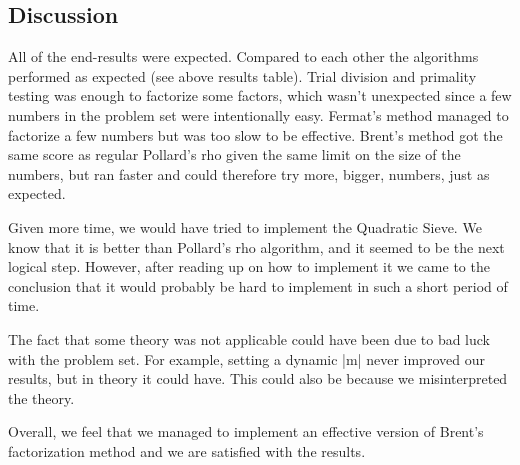 \documentclass[paper=a4, fontsize=11pt,numbers=endperiod]{scrartcl} %
\numberwithin{equation}{section} %
\numberwithin{figure}{section} %
\numberwithin{table}{section} %
\begin{document}
{\subsection{Discussion}

All of the end-results were expected.
Compared to each other the algorithms performed as expected (see above results table).
Trial division and primality testing was enough to factorize some factors, which wasn't unexpected since a few numbers in the problem set were intentionally easy.
Fermat's method managed to factorize a few numbers but was too slow to be effective.
Brent's method got the same score as regular Pollard's rho given the same limit on the size of the numbers, but ran faster and could therefore try more, bigger, numbers, just as expected.

Given more time, we would have tried to implement the Quadratic Sieve.
We know that it is better than Pollard's rho algorithm, and it seemed to be the next logical step.
However, after reading up on how to implement it we came to the conclusion that it would probably be hard to implement in such a short period of time.

The fact that some theory was not applicable could have been due to bad luck with the problem set. For example, setting a dynamic |m| never improved our results, but in theory it could have. This could also be because we misinterpreted the theory.

Overall, we feel that we managed to implement an effective version of Brent's factorization method and we are satisfied with the results.


\newpage
\begin{thebibliography}{9}


\end{thebibliography}}
\end{document}
